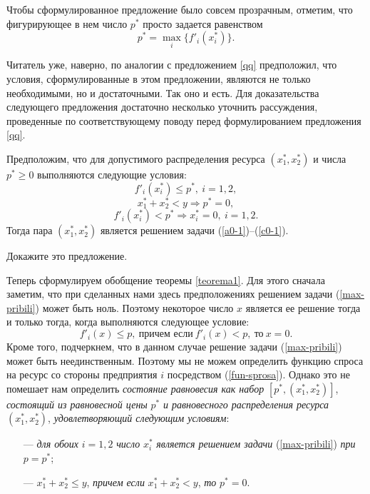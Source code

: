     Чтобы сформулированное предложение было совсем прозрачным,
    отметим, что фигурирующее в нем число $p^{*}$ просто задается равенством
    \[p^{*}=\max_{i}\{f'_{i}(x_{i}^{*})\}.\]

    Читатель уже, наверно, по аналогии с предложением \ref{qq} предположил, что условия,
    сформулированные в этом предложении, являются не только
    необходимыми, но и достаточными. Так оно и есть. Для доказательства
    следующего предложения достаточно несколько уточнить рассуждения,
    проведенные по соответствующему поводу перед формулированием предложения \ref{qq}.

    \begin{prop}
   \label{qq-2}
    Предположим, что для допустимого распределения ресурса
    $(x_{1}^{*},x_{2}^{*})$ и числа $p^{*}\geqslant0$ выполняются
    следующие условия:
    \[f'_{i}(x_{i}^{*})\leqslant p^{*},\ i=1,2,\]
    \[x_{1}^{*}+x_{2}^{*}<y \Rightarrow p^{*}=0,\]
    \[f'_{i}(x_{i}^{*})<p^{*} \Rightarrow x_{i}^{*}=0,\ i=1,2.\]
        Тогда пара $(x_{1}^{*},x_{2}^{*})$ является решением задачи
    (\ref{a0-1})--(\ref{c0-1}).
    \end{prop}

\begin{exer}
    Докажите это предложение.
\end{exer}


    Теперь сформулируем обобщение теоремы \ref{teorema1}. Для этого
    сначала заметим, что при сделанных нами здесь предположениях
    решением задачи (\ref{max-pribili}) может быть ноль. Поэтому некоторое число $x$
    является ее решение тогда и только тогда, когда выполняются
    следующее условие:
    \[f'_{i}(x)\leqslant p,\ \text{причем если}\ f'_{i}(x)<p,\ \text{то}\  x=0.\]
    Кроме того, подчеркнем, что в данном случае решение задачи
    (\ref{max-pribili}) может быть неединственным. Поэтому мы не
    можем определить функцию спроса на ресурс со стороны предприятия
    $i$ посредством (\ref{fun-sprosa}). Однако это не помешает нам
    определить \emph{состояние равновесия как набор}
    $[p^{*},(x_{1}^{*},x_{2}^{*})]$, \emph{состоящий из равновесной цены}
    $p^{*}$ \emph{и равновесного распределения ресурса}
    $(x_{1}^{*},x_{2}^{*})$,
    \emph{удовлетворяющий следующим условиям}:

    \begin{itemize}
    \item [---]
        \emph{для обоих} $i=1,2$ \emph{число} $x_{i}^{*}$
        \emph{является решением задачи} (\ref{max-pribili})
        \emph{при} $p=p^{*}$;
    \item [---]
    $x_{1}^{*}+x_{2}^{*}\leqslant y$, \emph{причем если} $x_{1}^{*}+x_{2}^{*}<y$, \emph{то}
    $p^{*}=0$.

    \end{itemize}

